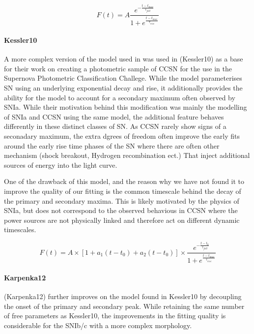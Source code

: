 \begin{equation}
\label{eq:Bazin09}
  F(t) = A \frac{e^{-\frac{t - t_{max}}{\tau_{fall}}}} {1 + e^{\frac{t - t_{max}}{\tau_{rise}}}}
\end{equation}

\paragraph{Kessler10}
A more complex version of the model used in \citet{Bazin2009} was used in \citet{Kessler2010} (Kessler10) as a base for their work on creating a photometric sample of CCSN for the use in the Supernova Photometric Classification Challege. While the model parameterises SN using an underlying exponential decay and rise, it additionally provides the ability for the model to account for a secondary maximum often observed by SNIa. While their motivation behind this modification was mainly the modelling of SNIa and CCSN using the same model, the additional feature behaves differently in these distinct classes of SN. As CCSN rarely show signs of a seconadary maximum, the extra dgrees of freedom often improve the early fits around the early rise time phases of the SN where there are often other mechanism (shock breakout, Hydrogen recombination ect.) That inject additional sources of energy into the light curve.

One of the drawback of this model, and the reason why we have not found it to improve the quality of our fitting is the common timescale behind the decay of the primary and secondary maxima. This is likely motivated by the physics of SNIa, but does not correspond to the observed behavious in CCSN where the power sources are not physically linked and therefore act on different dynamic timescales.

\begin{equation}
  F(t) = A \times [1 + a_1(t - {t_0}) + a_2(t - {t_0})] \times \frac{e^{-\frac{t - t_{0}}{\tau_{fall}}}} {1 + e^{\frac{t - t_{max}}{\tau_{rise}}}}
\end{equation}

\paragraph{Karpenka12}
\citet{Karpenka2012} (Karpenka12) further improves on the model found in Kessler10 by decoupling the onset of the primary and secondary peak. While retaining the same number of free parameters as Kessler10, the improvements in the fitting quality is considerable for the SNIb/c with a more complex morphology.

